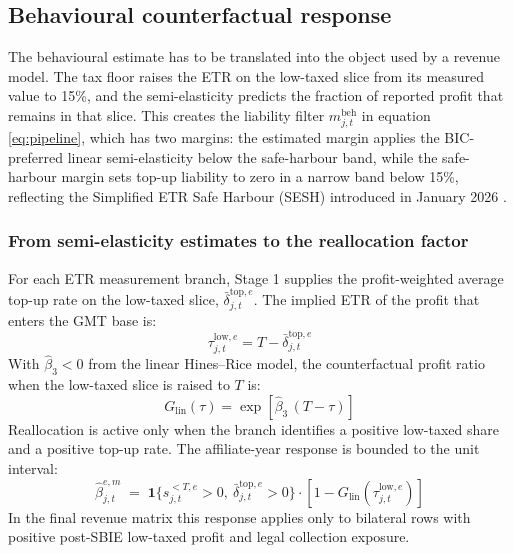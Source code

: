 \documentclass[11pt,a4paper]{article}
\begin{document}
\subsection{Behavioural counterfactual response}\label{sec:behavioural}

The behavioural estimate has to be translated into the object used by a revenue model. The tax floor raises the ETR on the low-taxed slice from its measured value to 15\%, and the semi-elasticity predicts the fraction of reported profit that remains in that slice. This creates the liability filter $m_{j,t}^{\text{beh}}$ in equation \eqref{eq:pipeline}, which has two margins: the estimated margin applies the BIC-preferred linear semi-elasticity below the safe-harbour band, while the safe-harbour margin sets top-up liability to zero in a narrow band below 15\%, reflecting the Simplified ETR Safe Harbour (SESH) introduced in January 2026 \citep{oecd2026}.

\subsubsection{From semi-elasticity estimates to the reallocation factor}\label{sec:reallocation_mapping}

For each ETR measurement branch, Stage 1 supplies the profit-weighted average top-up rate on the low-taxed slice, $\bar{\delta}_{j,t}^{\text{top},e}$. The implied ETR of the profit that enters the GMT base is:
\begin{equation}\label{eq:tau_low_segment}
\tau_{j,t}^{\text{low},e} = T - \bar{\delta}_{j,t}^{\text{top},e}
\end{equation}
With $\hat{\beta}_3<0$ from the linear Hines--Rice model, the counterfactual profit ratio when the low-taxed slice is raised to $T$ is:
\begin{equation}\label{eq:cf_linear}
G_{\text{lin}}(\tau) = \exp\!\left[\hat{\beta}_3\,(T-\tau)\right]
\end{equation}
Reallocation is active only when the branch identifies a positive low-taxed share and a positive top-up rate. The affiliate-year response is bounded to the unit interval:
\begin{equation}\label{eq:beta_aggregated}
\hat{\beta}_{j,t}^{e,m}
\;=\;
\mathbf{1}\{s_{j,t}^{<T,e}>0,\ \bar{\delta}_{j,t}^{\text{top},e}>0\}
\cdot \left[1-G_{\text{lin}}\!\left(\tau_{j,t}^{\text{low},e}\right)\right]
\end{equation}
In the final revenue matrix this response applies only to bilateral rows with positive post-SBIE low-taxed profit and legal collection exposure. 
\end{document}
